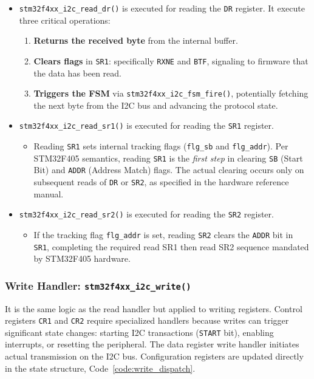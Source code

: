 \begin{itemize}
    \item \texttt{stm32f4xx\_i2c\_read\_dr()} is executed for reading the \texttt{DR} register. It execute three critical operations:
    
    \begin{enumerate}
        \item \textbf{Returns the received byte} from the internal buffer.
        \item \textbf{Clears flags} in \texttt{SR1}: specifically \texttt{RXNE} and \texttt{BTF}, signaling to firmware that the data has been read.
        \item \textbf{Triggers the FSM} via \texttt{stm32f4xx\_i2c\_fsm\_fire()}, potentially fetching the next byte from the I2C bus and advancing the protocol state.
    \end{enumerate}

    \item \texttt{stm32f4xx\_i2c\_read\_sr1()} is executed for reading the \texttt{SR1} register.

    \begin{itemize}
        \item Reading \texttt{SR1} sets internal tracking flags (\texttt{flg\_sb} and \texttt{flg\_addr}). 
            Per STM32F405 semantics, reading \texttt{SR1} is the \emph{first step} in clearing 
            \texttt{SB} (Start Bit) and \texttt{ADDR} (Address Match) flags. The actual clearing 
            occurs only on subsequent reads of \texttt{DR} or \texttt{SR2}, as specified in the 
            hardware reference manual.
    \end{itemize}

    \item \texttt{stm32f4xx\_i2c\_read\_sr2()} is executed for reading the \texttt{SR2} register.
    \begin{itemize}
        \item If the tracking flag \texttt{flg\_addr} is set, reading \texttt{SR2} clears the 
        \texttt{ADDR} bit in \texttt{SR1}, completing the required read SR1 then read SR2 
        sequence mandated by STM32F405 hardware.
    \end{itemize}

\end{itemize}



\subsubsection{Write Handler: \texttt{stm32f4xx\_i2c\_write()}}
\label{subsec:write_handler}

It is the same logic as the read handler but applied to writing registers.
Control registers \texttt{CR1} and \texttt{CR2} require specialized handlers because 
writes can trigger significant state changes: starting I2C transactions (\texttt{START} 
bit), enabling interrupts, or resetting the peripheral. The data register write handler 
initiates actual transmission on the I2C bus. Configuration registers are updated 
directly in the state structure, Code~\ref{code:write_dispatch}.